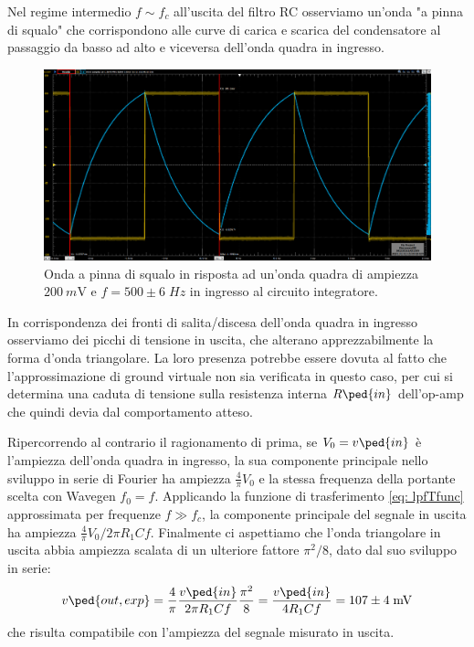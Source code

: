 \documentclass[10pt,a4paper]{article}
\begin{document}
Nel regime intermedio $f \sim f_c$ all'uscita del filtro RC osserviamo un'onda
"a pinna di squalo" che corrispondono alle curve di carica e scarica del
condensatore al passaggio da basso ad alto e viceversa dell'onda quadra in
ingresso.
\begin{figure}[htbp]
\centering
\includegraphics[scale=0.335]{intfin}
\caption{Onda a pinna di squalo in risposta ad un'onda quadra di ampiezza
$\SI{200}{m\V}$ e $f = 500 \pm 6 \; \si{Hz}$ in ingresso al circuito
integratore. \label{fig: intfin}}
\end{figure}

In corrispondenza dei fronti di salita/discesa dell'onda quadra in ingresso
osserviamo dei picchi di tensione in uscita, che alterano apprezzabilmente
la forma d'onda triangolare. La loro presenza potrebbe essere dovuta al fatto
che l'approssimazione di ground virtuale non sia verificata in questo caso,
per cui si determina una caduta di tensione sulla resistenza interna
$R\ped{in}$ dell'op-amp che quindi devia dal comportamento atteso.

Ripercorrendo al contrario il ragionamento di prima, se $V_0 = v\ped{in}$ è
l'ampiezza dell'onda quadra in ingresso, la sua componente principale nello
sviluppo in serie di Fourier ha ampiezza $\frac{4}{\pi} V_0$ e la stessa
frequenza della portante scelta con Wavegen $f_0 = f$.
Applicando la funzione di trasferimento \eqref{eq: lpfTfunc} approssimata per
frequenze $f \gg f_c$, la componente principale del segnale in uscita ha
ampiezza $\frac{4}{\pi} V_0 / 2\pi R_1 C f$. Finalmente ci aspettiamo che
l'onda triangolare in uscita abbia ampiezza scalata di un ulteriore fattore
$\pi^2/8$, dato dal suo sviluppo in serie:
\[
v\ped{out, exp} = \frac{4}{\pi} \frac{v\ped{in}}{2 \pi R_1 C f} \frac{\pi^2}{8} =
\frac{v\ped{in}}{4 R_1 C f} = 107 \pm 4 \; \si{m\V}
\]
che risulta compatibile con l'ampiezza del segnale misurato in uscita.
\end{document}
